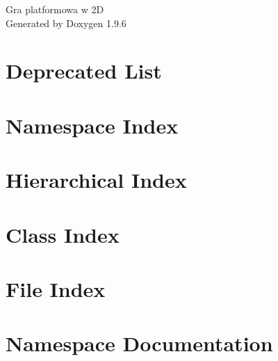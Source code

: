 \documentclass[twoside]{book}
\newcommand{\+}{\discretionary{\mbox{\scriptsize$\hookleftarrow$}}{}{}}
\newcommand{\clearemptydoublepage}{%
    \newpage{\pagestyle{empty}\cleardoublepage}%
  }
\begin{document}
  \raggedbottom
    \hypersetup{pageanchor=false,
                bookmarksnumbered=true,
                pdfencoding=unicode
               }
  \begin{titlepage}
  \vspace*{7cm}
  \begin{center}%
  {\Large Gra platformowa w 2D}\\
  \vspace*{1cm}
  {\large Generated by Doxygen 1.9.6}\\
  \end{center}
  \end{titlepage}
  \clearemptydoublepage
  \tableofcontents
  \clearemptydoublepage
  \hypersetup{pageanchor=true}
\chapter{Deprecated List}
\label{deprecated}

\chapter{Namespace Index}

\chapter{Hierarchical Index}

\chapter{Class Index}

\chapter{File Index}

\chapter{Namespace Documentation}

\end{document}
